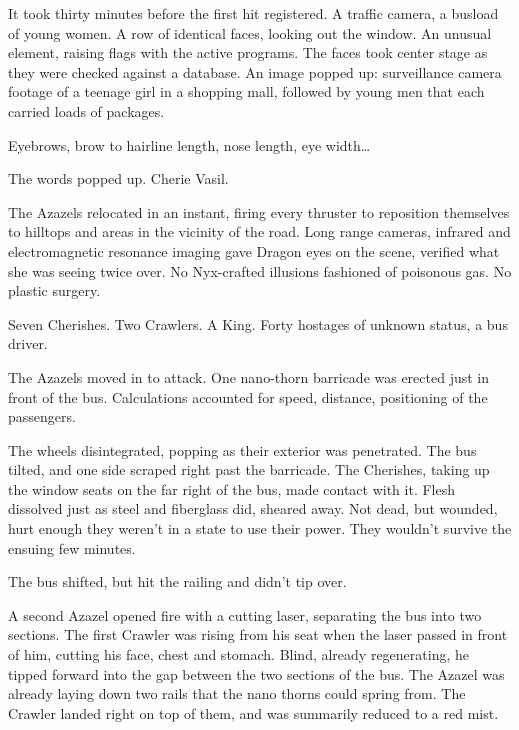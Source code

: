 It took thirty minutes before the first hit registered.  A traffic camera, a busload of young women.  A row of identical faces, looking out the window.  An unusual element, raising flags with the active programs.  The faces took center stage as they were checked against a database.  An image popped up: surveillance camera footage of a teenage girl in a shopping mall, followed by young men that each carried loads of packages.



Eyebrows, brow to hairline length, nose length, eye width\ldots



The words popped up.  Cherie Vasil.



The Azazels relocated in an instant, firing every thruster to reposition themselves to hilltops and areas in the vicinity of the road.  Long range cameras, infrared and electromagnetic resonance imaging gave Dragon eyes on the scene, verified what she was seeing twice over.  No Nyx-crafted illusions fashioned of poisonous gas.  No plastic surgery.



Seven Cherishes.  Two Crawlers.  A King.  Forty hostages of unknown status, a bus driver.



The Azazels moved in to attack.  One nano-thorn barricade was erected just in front of the bus.  Calculations accounted for speed, distance, positioning of the passengers.



The wheels disintegrated, popping as their exterior was penetrated.  The bus tilted, and one side scraped right past the barricade.  The Cherishes, taking up the window seats on the far right of the bus, made contact with it.  Flesh dissolved just as steel and fiberglass did, sheared away.  Not dead, but wounded, hurt enough they weren't in a state to use their power.  They wouldn't survive the ensuing few minutes.



The bus shifted, but hit the railing and didn't tip over.



A second Azazel opened fire with a cutting laser, separating the bus into two sections.  The first Crawler was rising from his seat when the laser passed in front of him, cutting his face, chest and stomach.  Blind, already regenerating, he tipped forward into the gap between the two sections of the bus.  The Azazel was already laying down two rails that the nano thorns could spring from.  The Crawler landed right on top of them, and was summarily reduced to a red mist.



